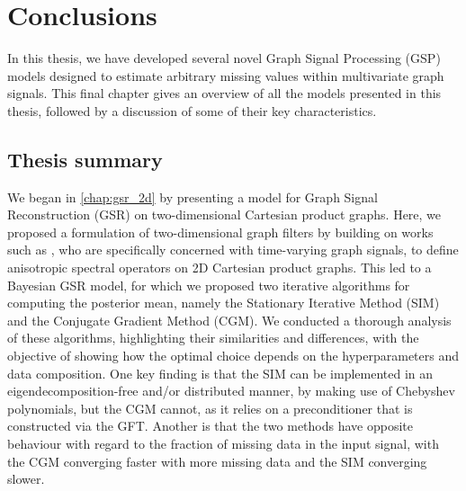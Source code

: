 \chapter{Conclusions} %

\label{chap:conclusions} %


In this thesis, we have developed several novel Graph Signal Processing (GSP) models designed to estimate arbitrary missing values within multivariate graph signals. This final chapter gives an overview of all the models presented in this thesis, followed by a discussion of some of their key characteristics.

\section{Thesis summary}

We began in \cref{chap:gsr_2d} by presenting a model for Graph Signal Reconstruction (GSR) on two-dimensional Cartesian product graphs. Here, we proposed a formulation of two-dimensional graph filters by building on works such as \cite{Ioannidis2016,Grassi2018,Isufi2017,Loukas2016}, who are specifically concerned with time-varying graph signals, to define anisotropic spectral operators on 2D Cartesian product graphs. This led to a Bayesian GSR model, for which we proposed two iterative algorithms for computing the posterior mean, namely the Stationary Iterative Method (SIM) and the Conjugate Gradient Method (CGM). We conducted a thorough analysis of these algorithms, highlighting their similarities and differences, with the objective of showing how the optimal choice depends on the hyperparameters and data composition. One key finding is that the SIM can be implemented in an eigendecomposition-free and/or distributed manner, by making use of Chebyshev polynomials, but the CGM cannot, as it relies on a preconditioner that is constructed via the GFT. Another is that the two methods have opposite behaviour with regard to the fraction of missing data in the input signal, with the CGM converging faster with more missing data and the SIM converging slower. 

